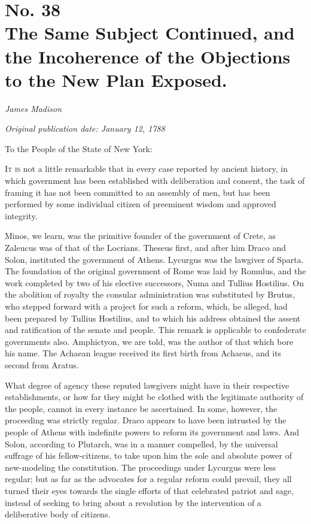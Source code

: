 \chapter[No. 38: The Same Subject Continued, and the Incoherence of the Objections to the New Plan Exposed.]{No. 38\\ {\small The Same Subject Continued, and the Incoherence of the Objections to the New Plan Exposed.}}

\textit{James Madison}

\textit{Original publication date: January 12, 1788}
\vspace{1cm}

To the People of the State of New York:
\vspace{.4cm}

\textsc{It is} not a little remarkable that in every case reported by ancient history, in which government has been established with deliberation and consent, the task of framing it has not been committed to an assembly of men, but has been performed by some individual citizen of preeminent wisdom and approved integrity.

Minos, we learn, was the primitive founder of the government of Crete, as Zaleucus was of that of the Locrians. 
Theseus first, and after him Draco and Solon, instituted the government of Athens. 
Lycurgus was the lawgiver of Sparta. 
The foundation of the original government of Rome was laid by Romulus, and the work completed by two of his elective successors, Numa and Tullius Hostilius. 
On the abolition of royalty the consular administration was substituted by Brutus, who stepped forward with a project for such a reform, which, he alleged, had been prepared by Tullius Hostilius, and to which his address obtained the assent and ratification of the senate and people. 
This remark is applicable to confederate governments also. 
Amphictyon, we are told, was the author of that which bore his name. 
The Achaean league received its first birth from Achaeus, and its second from Aratus.

What degree of agency these reputed lawgivers might have in their respective establishments, or how far they might be clothed with the legitimate authority of the people, cannot in every instance be ascertained. 
In some, however, the proceeding was strictly regular. 
Draco appears to have been intrusted by the people of Athens with indefinite powers to reform its government and laws. 
And Solon, according to Plutarch, was in a manner compelled, by the universal suffrage of his fellow-citizens, to take upon him the sole and absolute power of new-modeling the constitution. 
The proceedings under Lycurgus were less regular; but as far as the advocates for a regular reform could prevail, they all turned their eyes towards the single efforts of that celebrated patriot and sage, instead of seeking to bring about a revolution by the intervention of a deliberative body of citizens.

